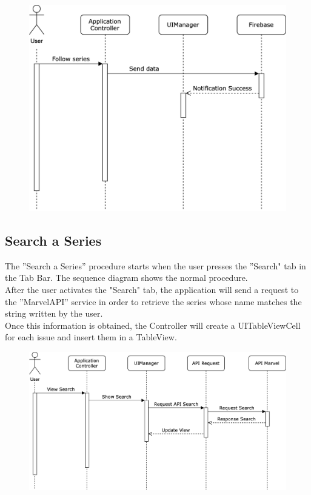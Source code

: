 \vspace{5mm}

\begin{figure}[h]
\centering
\includegraphics[width=\textwidth]{img/seqdiagrams/followseries}
\end{figure}

\clearpage

\subsection{Search a Series}
The ”Search a Series” procedure starts when the user presses the ”Search" tab in the Tab Bar. The sequence diagram shows the normal procedure. \\
After the user activates the "Search" tab, the application will send a request to the ”MarvelAPI” service in order to retrieve the series whose name matches the string written by the user. \\
Once this information is obtained, the Controller will create a UITableViewCell for each issue and insert them in a TableView. 

\vspace{5mm}

\begin{figure}[h]
\centering
\includegraphics[width=\textwidth]{img/seqdiagrams/searchseries}
\end{figure}


